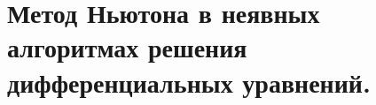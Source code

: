 \documentclass[../../calc-math-exam-2023.tex]{subfiles}
\begin{document}
    \section{Метод Ньютона в неявных алгоритмах решения дифференциальных уравнений.}\label{sec:ch28}
\end{document}
